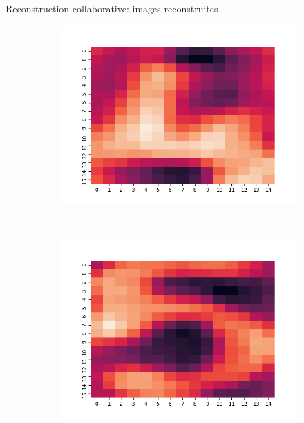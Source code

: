 \documentclass[hyperref={pdfpagelabels=false}]{beamer}
\begin{document}
\begin{frame}{Reconstruction collaborative: images reconstruites}
\begin{figure}[h]
\begin{subfigure}[c]{0.18\textwidth}
                \includegraphics[scale=.12]{4}
            \end{subfigure}
            \\
            \begin{subfigure}[c]{0.18\textwidth}
                \includegraphics[scale=.12]{5}
            \end{subfigure}
            \begin{subfigure}[c]{0.18\textwidth}

\end{subfigure}
\end{figure}
\end{frame}
\end{document}
